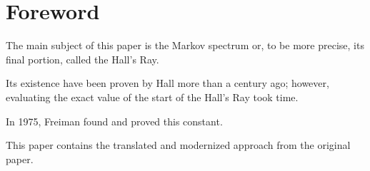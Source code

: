 \section{Foreword}

The main subject of this paper is the Markov spectrum or, to be more precise,
its final portion, called the Hall's Ray.

Its existence have been proven by Hall more than a century ago;
however, evaluating the exact value of the start of the Hall's Ray took time.

In 1975, Freiman found and proved this constant.

This paper contains the translated and modernized approach from the original paper.
